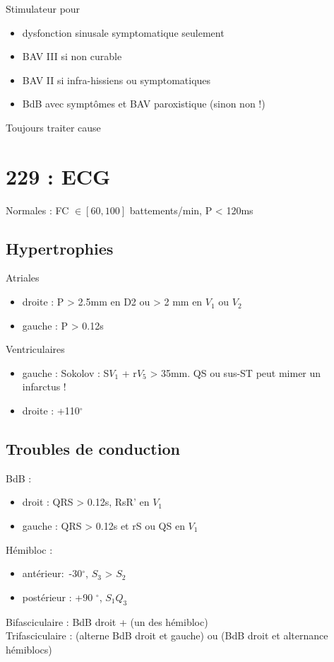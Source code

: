 \documentclass{article}
\begin{document}
Stimulateur pour 
\begin{itemize}
  \item dysfonction sinusale symptomatique seulement
  \item BAV III si non curable
  \item BAV II si infra-hissiens ou symptomatiques
  \item BdB avec symptômes et BAV paroxistique (sinon non !)
\end{itemize}
Toujours traiter cause

\section{229 : ECG}%
\label{sec:229_ecg}
Normales : FC $\in [60, 100]$ battements/min, P < 120ms

\subsection{Hypertrophies}

Atriales
\begin{itemize}
  \item droite : P > 2.5mm en D2 ou > 2 mm en $V_1$ ou $V_2$
  \item gauche : P > 0.12s
\end{itemize}
Ventriculaires
\begin{itemize}
  \item gauche : Sokolov : S$V_1$ + r$V_5$ > 35mm. \danger{} QS ou sus-ST peut
    mimer un infarctus !
  \item droite : +110$^{\circ}$
\end{itemize}

\subsection{Troubles de conduction}
BdB :
\begin{itemize}
  \item droit : QRS > 0.12s, RsR' en $V_1$ 
  \item gauche : QRS > 0.12s et rS ou QS en $V_1$
\end{itemize}
Hémibloc : 
\begin{itemize}
  \item antérieur: -30$^{\circ}$, $S_3$ > $S_2$
  \item postérieur : +90 $^{\circ}$, $S_1 Q_3$
\end{itemize}
Bifasciculaire : BdB droit + (un des hémibloc)\\
Trifasciculaire \skull : (alterne BdB droit et gauche) ou (BdB droit et
alternance hémiblocs)
\end{document}
